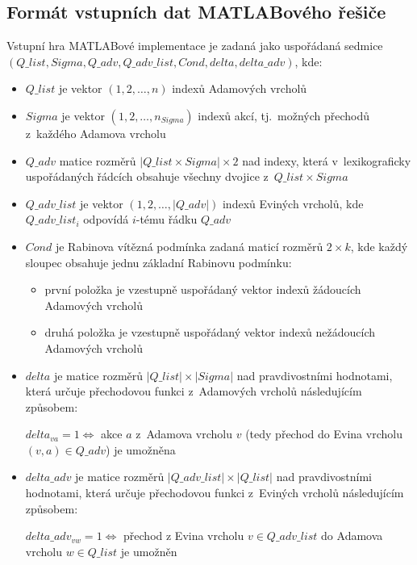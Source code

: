 \subsection{Formát vstupních dat MATLABového řešiče}
\label{sec:matlabovyresic:vstupnidata:format}
Vstupní hra MATLABové implementace je zadaná jako uspořádaná sedmice $(Q\_list, Sigma, Q\_adv, Q\_adv\_list, Cond, delta, delta\_adv)$, kde:
\begin{itemize}
\item $Q\_list$ je vektor $(1, 2, \dotsc, n)$ indexů Adamových vrcholů
\item $Sigma$ je vektor $(1, 2, \dotsc, n_{Sigma})$ indexů akcí, tj.~možných přechodů z~každého Adamova vrcholu
\item $Q\_adv$ matice rozměrů $|Q\_list \times Sigma| \times 2$ nad indexy, která v~lexikograficky uspořádaných řádcích obsahuje všechny dvojice z~$Q\_list \times Sigma$
\item $Q\_adv\_list$ je vektor $(1, 2, \dotsc, |Q\_adv|)$ indexů Eviných vrcholů, kde $Q\_adv\_list_i$ odpovídá $i$-tému řádku $Q\_adv$
\item $Cond$ je Rabinova vítězná podmínka zadaná maticí rozměrů $2 \times k$, kde každý sloupec obsahuje jednu základní Rabinovu podmínku:
\begin{itemize}
\item první položka je vzestupně uspořádaný vektor indexů žádoucích Adamových vrcholů
\item druhá položka je vzestupně uspořádaný vektor indexů nežádoucích Adamových vrcholů
\end{itemize}
\item $delta$ je matice rozměrů $|Q\_list| \times |Sigma|$ nad pravdivostními hodnotami, která určuje přechodovou funkci z~Adamových vrcholů následujícím způsobem:

$delta_{va} = 1 \Leftrightarrow$ akce $a$ z~Adamova vrcholu $v$ (tedy přechod do Evina vrcholu $(v, a) \in Q\_adv$) je umožněna
\item $delta\_adv$ je matice rozměrů $|Q\_adv\_list| \times |Q\_list|$ nad pravdivostními hodnotami, která určuje přechodovou funkci z~Eviných vrcholů následujícím způsobem:

$delta\_adv_{vw} = 1 \Leftrightarrow$ přechod z Evina vrcholu $v \in Q\_adv\_list$ do Adamova vrcholu $w \in Q\_list$ je umožněn
\end{itemize}

